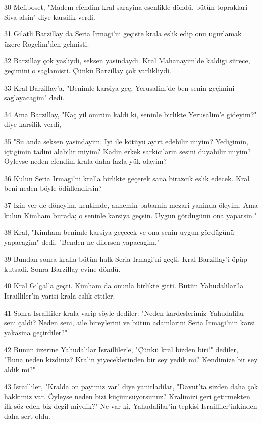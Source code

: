 \par 30 Mefiboset, "Madem efendim kral sarayina esenlikle döndü, bütün topraklari Siva alsin" diye karsilik verdi.
\par 31 Gilatli Barzillay da Seria Irmagi'ni geçiste krala eslik edip onu ugurlamak üzere Rogelim'den gelmisti.
\par 32 Barzillay çok yasliydi, seksen yasindaydi. Kral Mahanayim'de kaldigi sürece, geçimini o saglamisti. Çünkü Barzillay çok varlikliydi.
\par 33 Kral Barzillay'a, "Benimle karsiya geç, Yerusalim'de ben senin geçimini saglayacagim" dedi.
\par 34 Ama Barzillay, "Kaç yil ömrüm kaldi ki, seninle birlikte Yerusalim'e gideyim?" diye karsilik verdi,
\par 35 "Su anda seksen yasindayim. Iyi ile kötüyü ayirt edebilir miyim? Yedigimin, içtigimin tadini alabilir miyim? Kadin erkek sarkicilarin sesini duyabilir miyim? Öyleyse neden efendim krala daha fazla yük olayim?
\par 36 Kulun Seria Irmagi'ni kralla birlikte geçerek sana birazcik eslik edecek. Kral beni neden böyle ödüllendirsin?
\par 37 Izin ver de döneyim, kentimde, annemin babamin mezari yaninda öleyim. Ama kulun Kimham burada; o seninle karsiya geçsin. Uygun gördügünü ona yaparsin."
\par 38 Kral, "Kimham benimle karsiya geçecek ve ona senin uygun gördügünü yapacagim" dedi, "Benden ne dilersen yapacagim."
\par 39 Bundan sonra kralla bütün halk Seria Irmagi'ni geçti. Kral Barzillay'i öpüp kutsadi. Sonra Barzillay evine döndü.
\par 40 Kral Gilgal'a geçti. Kimham da onunla birlikte gitti. Bütün Yahudalilar'la Israilliler'in yarisi krala eslik ettiler.
\par 41 Sonra Israilliler krala varip söyle dediler: "Neden kardeslerimiz Yahudalilar seni çaldi? Neden seni, aile bireylerini ve bütün adamlarini Seria Irmagi'nin karsi yakasina geçirdiler?"
\par 42 Bunun üzerine Yahudalilar Israilliler'e, "Çünkü kral bizden biri!" dediler, "Buna neden kizdiniz? Kralin yiyeceklerinden bir sey yedik mi? Kendimize bir sey aldik mi?"
\par 43 Israilliler, "Kralda on payimiz var" diye yanitladilar, "Davut'ta sizden daha çok hakkimiz var. Öyleyse neden bizi küçümsüyorsunuz? Kralimizi geri getirmekten ilk söz eden biz degil miydik?" Ne var ki, Yahudalilar'in tepkisi Israilliler'inkinden daha sert oldu.

